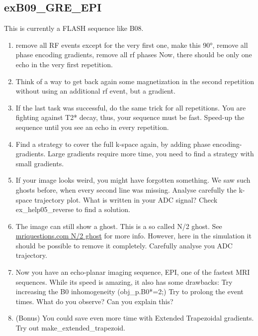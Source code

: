 \documentclass[a4paper,12pt]{extarticle}
\begin{document}
\subsection{exB09\_GRE\_EPI}
This is  currently a FLASH sequence like B08.
\begin{enumerate}
\item remove all RF events except for the very first one, make this 90°, remove all phase encoding gradients, remove all rf phases
        Now, there should be only one echo in the very first repetition. 
\item Think of a way to get back again some magnetization in the second repetition without using an additional rf event, but a gradient.
\item If the last task was successful, do the same trick for all repetitions. You are fighting against T2* decay, thus, your sequence must be fast. Speed-up the sequence until you see an echo in every repetition.
\item Find a strategy to cover the full k-space again, by adding phase encoding-gradients. Large gradients require more time, you need to find a strategy with small gradients.

\item If your image looks weird, you might have forgotten something. We saw such ghosts before, when every second line was missing. Analyse carefully the k-space trajectory plot. What is written in your ADC signal?
Check ex\_help05\_reverse to find a solution.
\item The image can still show a ghost. This is a so called N/2 ghost. See \href{http://mriquestions.com/nyquist-n2-ghosts.html}{mriquestions.com N/2 ghost} for more info. However, here in the simulation it should be possible to remove it completely. Carefully analyse you ADC trajectory.
\item  Now you have an echo-planar imaging sequence, EPI, one of the fastest MRI sequences. While its speed is amazing, it also has some drawbacks: 
        Try increasing the B0 inhomogeneity (obj\_p.B0*=2;) 
        Try to prolong the event times. What do you observe? Can you explain this?
\item (Bonus) You could save even more time with Extended Trapezoidal gradients. Try out make\_extended\_trapezoid. 
\end{enumerate}
\end{document}
